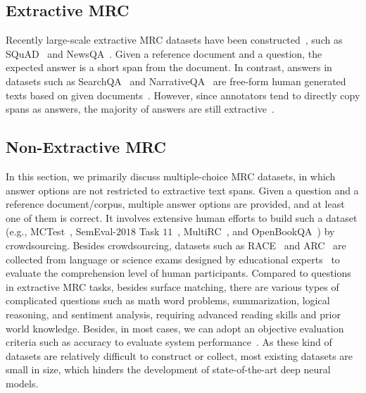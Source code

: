\documentclass[11pt,a4paper]{article}
\newcommand{\eg}{{e.g.}}
\begin{document}
\subsection{Extractive MRC}
\label{sec:task:extractive}
Recently large-scale extractive MRC datasets have been constructed~\cite{hermann2015teaching,hill2015goldilocks,onishi2016did,chen2016character,mostafazadeh2016corpus,bajgar2016embracing,nguyen2016ms,triviaQA,ma2018challenging}, such as SQuAD~\cite{rajpurkar2016squad} and NewsQA~\cite{trischler2017newsqa}. Given a reference document and a question, the expected answer is a short span from the document. In contrast, answers in datasets such as SearchQA~\cite{dunn2017searchqa} and NarrativeQA~\cite{kovcisky2018narrativeqa} are free-form human generated texts based on given documents~\cite{nguyen2016ms,reddy2018coqa,choi2018quac}. However, since annotators tend to directly copy spans as answers, the majority of answers are still extractive~\cite{reddy2018coqa,kovcisky2018narrativeqa}. 

\subsection{Non-Extractive MRC}
\label{sec:task:multiple}
In this section, we primarily discuss multiple-choice MRC datasets, in which answer options are not restricted to extractive text spans. Given a question and a reference document/corpus, multiple answer options are provided, and at least one of them is correct. It involves extensive
human efforts to build such a dataset (\eg, MCTest~\cite{richardson2013mctest}, SemEval-$2018$ Task $11$~\cite{ostermann2018semeval}, MultiRC~\cite{khashabi2018looking}, and OpenBookQA~\cite{mihaylov2018can}) by crowdsourcing. Besides crowdsourcing, datasets such as RACE~\cite{lai2017race} and ARC~\cite{clark2018think} are collected from language or science exams designed by educational experts~\cite{penas2014overview,shibuki2014overview,tseng2016towards} to evaluate the comprehension level of human participants. Compared to questions in extractive MRC tasks, besides surface matching, there are various types of complicated questions such as math word problems, summarization, logical reasoning, and sentiment analysis, requiring advanced reading skills and prior world knowledge. Besides, in most cases, we can adopt an objective evaluation criteria such as accuracy to evaluate system performance~\cite{clark2016combining,lai2017race}. As these kind of datasets are relatively difficult to construct or collect, most existing datasets are small in size, which hinders the development of state-of-the-art deep neural models. 
\end{document}
